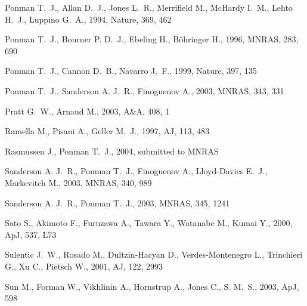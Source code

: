 \documentclass[usenatbib]{mn2e}
\begin{document}
\begin{thebibliography}{}
Ponman T.~J.,  Allan D.~J.,  Jones L.~R.,  Merrifield M.,  McHardy I.~M.,
  Lehto H.~J.,    Luppino G.~A.,  1994, Nature, 369, 462

Ponman T.~J.,  Bourner P. D.~J.,  Ebeling H.,    B{\"{o}}hringer H.,  1996,
  MNRAS, 283, 690

Ponman T.~J.,  Cannon D.~B.,    Navarro J.~F.,  1999, Nature, 397, 135

Ponman T.~J.,  Sanderson A. J.~R.,    Finoguenov A.,  2003, MNRAS, 343, 331

Pratt G.~W.,  Arnaud M.,  2003, A\&A, 408, 1

Ramella M.,  Pisani A.,    Geller M.~J.,  1997, AJ, 113, 483

Rasmussen J.,  Ponman T.~J.,  2004, submitted to MNRAS

Sanderson A. J.~R.,  Ponman T.~J.,  Finoguenov A.,  Lloyd-Davies E.~J.,
  Markevitch M.,  2003, MNRAS, 340, 989

Sanderson A. J.~R.,  Ponman T.~J.,  2003, MNRAS, 345, 1241

Sato S.,  Akimoto F.,  Furuzawa A.,  Tawara Y.,  Watanabe M.,    Kumai Y.,
  2000, ApJ, 537, L73

Sulentic J.~W.,  Rosado M.,  Dultzin-Hacyan D.,  Verdes-Montenegro L.,
  Trinchieri G.,  Xu C.,    Pietsch W.,  2001, AJ, 122, 2993

Sun M.,  Forman W.,  Vikhlinin A.,  Hornstrup A.,  Jones C.,    S. M.~S.,
  2003, ApJ, 598


\end{thebibliography}
\end{document}
